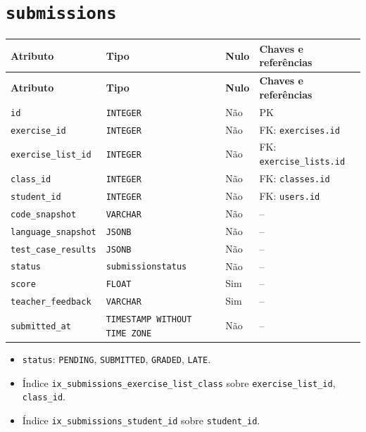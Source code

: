\section*{\texttt{submissions}}
\begingroup\footnotesize
\setlength{\tabcolsep}{4pt}\renewcommand{\arraystretch}{1.15}
\begin{longtable}{|>{\raggedright\arraybackslash}p{}|>{\raggedright\arraybackslash}p{}|>{\raggedright\arraybackslash}p{}|>{\raggedright\arraybackslash}p{}|}
\hline
\textbf{Atributo} & \textbf{Tipo} & \textbf{Nulo} & \textbf{Chaves e referências} \\ \hline
\endfirsthead
\hline \textbf{Atributo} & \textbf{Tipo} & \textbf{Nulo} & \textbf{Chaves e referências} \\ \hline
\endhead
\texttt{id} & \texttt{INTEGER} & Não & PK \\ \hline
\texttt{exercise\_\allowbreak{}id} & \texttt{INTEGER} & Não & FK: \texttt{exercises.id} \\ \hline
\texttt{exercise\_\allowbreak{}list\_\allowbreak{}id} & \texttt{INTEGER} & Não & FK: \texttt{exercise\_\allowbreak{}lists.id} \\ \hline
\texttt{class\_\allowbreak{}id} & \texttt{INTEGER} & Não & FK: \texttt{classes.id} \\ \hline
\texttt{student\_\allowbreak{}id} & \texttt{INTEGER} & Não & FK: \texttt{users.id} \\ \hline
\texttt{code\_\allowbreak{}snapshot} & \texttt{VARCHAR} & Não & -- \\ \hline
\texttt{language\_\allowbreak{}snapshot} & \texttt{JSONB} & Não & -- \\ \hline
\texttt{test\_\allowbreak{}case\_\allowbreak{}results} & \texttt{JSONB} & Não & -- \\ \hline
\texttt{status} & \texttt{submissionstatus} & Não & -- \\ \hline
\texttt{score} & \texttt{FLOAT} & Sim & -- \\ \hline
\texttt{teacher\_\allowbreak{}feedback} & \texttt{VARCHAR} & Sim & -- \\ \hline
\texttt{submitted\_\allowbreak{}at} & \texttt{TIMESTAMP WITHOUT TIME ZONE} & Não & -- \\ \hline
\end{longtable}
\begin{itemize}
\item \texttt{status}: \texttt{PENDING}, \texttt{SUBMITTED}, \texttt{GRADED}, \texttt{LATE}.
\item Índice \texttt{ix\_\allowbreak{}submissions\_\allowbreak{}exercise\_\allowbreak{}list\_\allowbreak{}class} sobre \texttt{exercise\_\allowbreak{}list\_\allowbreak{}id}, \texttt{class\_\allowbreak{}id}.
\item Índice \texttt{ix\_\allowbreak{}submissions\_\allowbreak{}student\_\allowbreak{}id} sobre \texttt{student\_\allowbreak{}id}.
\end{itemize}
\endgroup

